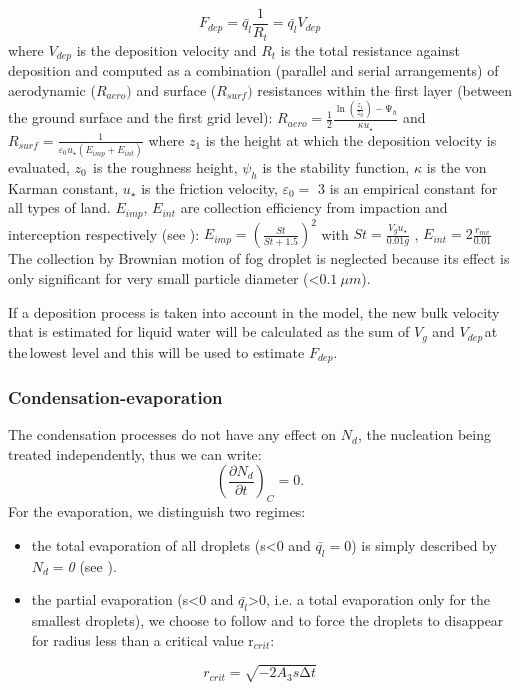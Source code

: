 \begin{equation}
F_{dep}=\bar{q_{l}}\frac{1}{R_{t}}=\bar{q_{l}}V_{dep}
\end{equation}
where $V_{dep}$ is the deposition velocity and $R_{t}$ is the total resistance
against deposition and computed as a combination (parallel and serial
arrangements) of aerodynamic ($R_{aero})$ and surface ($R_{surf})$ resistances
within the first layer (between the ground surface and the first grid level):
\newline
$R_{aero}=\frac{1}{2}\frac{\ln \left( \frac{z_{1}}{z_{0}}
\right)-\mathrm{\Psi }_{h}}{\kappa u_{\star }}$ and
$R_{surf}=\frac{1}{\varepsilon_{0}u_{\star }\left( E_{imp}+E_{int} \right)}$
\newline
where $z_{1}$ is the height at which the deposition velocity is evaluated,
$z_{0\, }$ is the roughness height, $\psi_{h}$ is the stability function,
$\kappa $ is the von Karman constant, $u_{\star }$ is the friction velocity,
$\varepsilon_{0}=$ 3 is an empirical constant for all types of land.
$E_{imp}$, $E_{int}$ are collection efficiency from impaction and interception
respectively (see \cite{Zhang:2001} ):
\newline
\newline
$E_{imp}=\left( \frac{St}{St+1.5} \right)^{2}$ with $St=\frac{V_{g}u_{\star
}}{0.01g}$ , $E_{int}=2\frac{r_{mv}}{0.01}$
\newline
\newline
The collection by Brownian motion of fog droplet is neglected because its
effect is only significant for very small particle diameter (\textless $\SI{0.1}{\mu m}$).

If a deposition process is taken into account in the model, the new bulk
velocity that is estimated for liquid water will be calculated as the sum of
$V_{g}$ and $V_{dep\, }$at the$_{\, }$lowest level and this will be used to
estimate $F_{dep}$.

\subsubsection{Condensation-evaporation}
The condensation processes do not have any effect on $N_{d}$, the nucleation
being treated independently, thus we can write:
\begin{equation}
\left( \frac{\partial N_{d}}{\partial t} \right)_{C}=0.
\end{equation}
For the evaporation, we distinguish two regimes:
\begin{itemize}
\item the total evaporation of all droplets (s\textless 0 and
 $\bar{q_{l}}=$0) is simply described by $N_{d}=$\textit{0} (see \cite{Cohard:2000}).
\item the partial evaporation (s\textless 0 and
 $\bar{q_{l}}$\textgreater 0, i.e. a total evaporation only for the
 smallest droplets), we choose to follow \cite{Chaumerliac:1987} and to force
 the droplets to disappear for radius less than a critical value r$_{crit}$:
\end{itemize}
\begin{equation}
r_{crit}=\sqrt {-2A_{3}s\mathrm{\Delta }t}
\end{equation}

